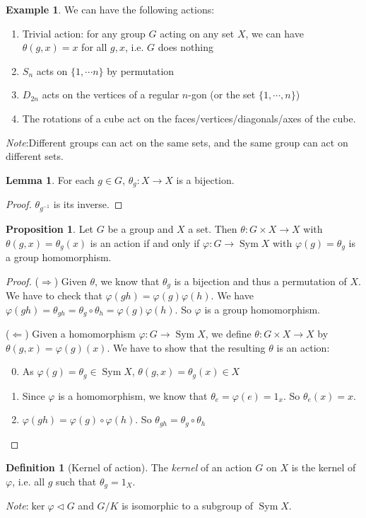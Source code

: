 \documentclass[a4paper]{article}
\theoremstyle{definition}
\newtheorem*{prop}{Proposition}
\newtheorem*{defi}{Definition}
\newtheorem*{eg}{Example}
\newtheorem*{lemma}{Lemma}
\newcommand{\note}{\noindent \emph{Note}:\;}
\DeclareMathOperator\Sym{Sym}
\begin{document}
\begin{eg}
  We can have the following actions:
  \begin{enumerate}
  \item Trivial action: for any group $G$ acting on any set $X$, we can have $\theta(g, x) = x$ for all $g, x$, i.e. $G$ does nothing
  \item $S_n$ acts on $\{1, \cdots n\}$ by permutation
  \item $D_{2n}$ acts on the vertices of a regular $n$-gon (or the set $\{1, \cdots, n\}$)
  \item The rotations of a cube act on the faces/vertices/diagonals/axes of the cube.
  \end{enumerate}
\end{eg}
\note Different groups can act on the same sets, and the same group can act on different sets.

\begin{lemma}
  For each $g\in G$, $\theta_g: X\to X$ is a bijection.
\end{lemma}

\begin{proof}
  $\theta_{g^{-1}}$ is its inverse.
\end{proof}

\begin{prop}
  Let $G$ be a group and $X$ a set. Then $\theta: G\times X\to X$ with $\theta(g, x) = \theta_g(x)$ is an action if and only if $\varphi: G\to \Sym X$ with $\varphi(g) = \theta_g$ is a group homomorphism.
\end{prop}

\begin{proof}
  ($\Rightarrow$) Given $\theta$, we know that $\theta_g$ is a bijection and thus a permutation of $X$. We have to check that $\varphi(gh) = \varphi(g)\varphi(h)$. We have $\varphi(gh) = \theta_{gh} = \theta_g\circ \theta_h = \varphi(g)\varphi(h)$. So $\varphi$ is a group homomorphism.

  ($\Leftarrow$) Given a homomorphism $\varphi: G\to \Sym X$, we define $\theta: G\times X\to X$ by $\theta(g, x) = \varphi(g)(x)$. We have to show that the resulting $\theta$ is an action:
  \begin{enumerate}[label=\arabic{*}.]
    \setcounter{enumi}{-1}
  \item As $\varphi(g) = \theta_g\in \Sym X$, $\theta(g, x) = \theta_g (x)\in X$
  \item Since $\varphi$ is a homomorphism, we know that $\theta_e  = \varphi(e) = 1_x$. So $\theta_e(x) = x$.
  \item $\varphi (gh) = \varphi(g)\circ \varphi(h)$. So $\theta_{gh} = \theta_g\circ \theta_h$
  \end{enumerate}
\end{proof}
\begin{defi}[Kernel of action]
  The \emph{kernel} of an action $G$ on $X$ is the kernel of $\varphi$, i.e. all $g$ such that $\theta_g = 1_X$.
\end{defi}
\note $\ker \varphi\lhd G$ and $G/K$ is isomorphic to a subgroup of $\Sym X$.
\end{document}
